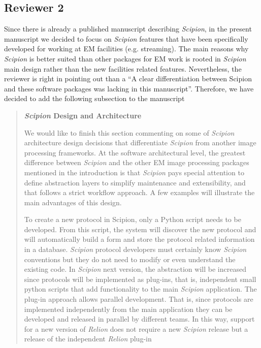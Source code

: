 \documentclass[a4paper,12pt]{article}
\def\scipion{\textit{Scipion}\xspace}
\begin{document}
\begin{reviewer}
\section*{Reviewer 2}



\reply Since there is already a published manuscript describing \scipion, in the present manuscript  we decided to focus on \scipion features that have been specifically developed for working at EM facilities (e.g. streaming). The main reasons why \scipion is better suited than other packages for EM work is rooted in \scipion main design rather than the new facilities related features. Nevertheless, the reviewer is right in pointing out than a ``A clear differentiation between Scipion and these software packages was lacking in this manuscript''. Therefore, we have decided to add the following subsection to the manuscript

\begin{quote}

\textbf{\scipion Design and Architecture}

We would like to finish this section commenting on some of \scipion architecture design decisions that differentiate \scipion from another image processing frameworks. At the software architectural level,  the greatest difference 
between \scipion and the other EM image processing packages mentioned in the introduction 
is that  \scipion pays special attention to define abstraction layers to simplify maintenance
and extensibility, and that follows a strict workflow approach. A few examples will illustrate the main advantages of this design.

To create a new protocol in Scipion, only a Python script needs to be developed. From this script, the system will discover the new protocol and will automatically build
a form and store the protocol related information in a database.
\scipion protocol developers must certainly know \scipion conventions
but they do not need to modify or even understand the existing code.
In  \scipion next version, the abstraction will be increased
since protocols will be implemented as plug-ins,
that is, independent small python scripts  that add functionality to the main
\scipion application. The plug-in approach allows parallel development. That is,  
since protocols are implemented independently from the main application
they can be developed and released in parallel by different teams. In this way, support for a new version of \textit{Relion} does not require a new \scipion release but
a release of the independent \textit{Relion} plug-in


\end{quote}
\end{reviewer}
\end{document}
